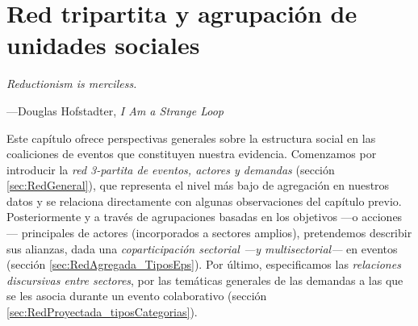 \documentclass[letterpaper, 11pt]{book}
\theoremstyle{definition}
\theoremstyle{remark}
\begin{document}
\chapter{Red tripartita y agrupación de unidades sociales}
\label{chap:Redes_TiposActor}

\epigraph{\itshape Reductionism is merciless.}{---Douglas Hofstadter, \textit{I Am a Strange Loop}}

\begingroup
\small
    Este capítulo ofrece perspectivas generales sobre la estructura social en las coaliciones de eventos que constituyen nuestra evidencia. 
    Comenzamos por introducir la \emph{red 3-partita de eventos, actores y demandas} (sección \ref{sec:RedGeneral}), que representa el nivel más bajo de agregación en nuestros datos y se relaciona directamente con algunas observaciones del capítulo previo. 
    Posteriormente y a través de agrupaciones basadas en los objetivos ---o acciones--- principales de actores (incorporados a sectores amplios), pretendemos describir sus alianzas, dada una \emph{coparticipación sectorial ---y multisectorial---} en eventos (sección \ref{sec:RedAgregada_TiposEps}). 
    Por último, especificamos las \emph{relaciones discursivas entre sectores}, por las temáticas generales de las demandas a las que se les asocia durante un evento colaborativo (sección \ref{sec:RedProyectada_tiposCategorias}).
\vspace{2em}
\endgroup
\end{document}
